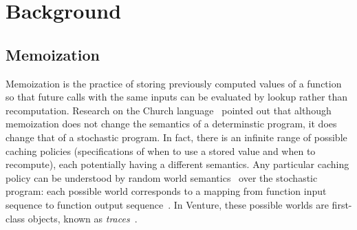 \documentclass{article} %
\begin{document}
\section{Background}
\subsection{Memoization}
Memoization is the practice of storing previously computed values of a function so that future calls with the same inputs can be evaluated by lookup rather than recomputation.
Research on the Church language~\citep{goodman2008church} pointed out that although memoization does not change the semantics of a determinstic program, it does change that of a stochastic program.
In fact, there is an infinite range of possible caching policies (specifications of when to use a stored value and when to recompute), each potentially having a different semantics.
Any particular caching policy can be understood by random world semantics~\citep{poole1993probabilistic,sato1995statistical} over the stochastic program: each possible world corresponds to a mapping from function input sequence to function output sequence~\citep{mcallester2008random}.
In Venture, these possible worlds are first-class objects, known as {\em traces}~\citep{mansinghka2014venture}.



\end{document}
